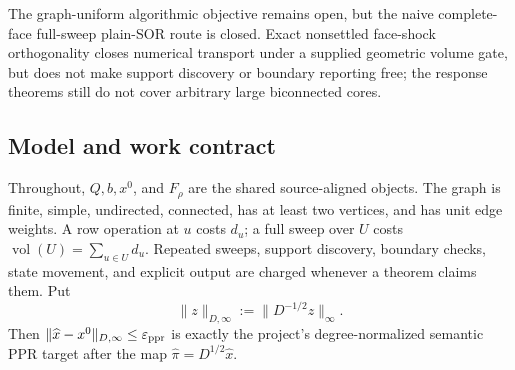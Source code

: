 The graph-uniform algorithmic objective remains open, but the naive
complete-face full-sweep plain-SOR route is closed.  Exact nonsettled
face-shock orthogonality closes numerical transport under a supplied
geometric volume gate, but does not make support discovery or boundary
reporting free; the response theorems still do not cover arbitrary large
biconnected cores.

\subsection{Model and work contract}

Throughout, $Q,b,x^0$, and $F_\rho$ are the shared source-aligned objects.
The graph is finite, simple, undirected, connected, has at least two vertices,
and has unit edge weights.  A row operation at $u$ costs $d_u$; a full sweep
over $U$ costs
$\operatorname{vol}(U)=\sum_{u\in U}d_u$.  Repeated sweeps, support discovery,
boundary checks, state movement, and explicit output are charged whenever a
theorem claims them.  Put
\begin{equation}
 \|z\|_{D,\infty}:=\|D^{-1/2}z\|_\infty.
 \label{eq:semantic-x-norm}
\end{equation}
Then $\|\widehat x-x^0\|_{D,\infty}\leq\varepsilon_{\rm ppr}$ is exactly the
project's degree-normalized semantic PPR target after the map
$\widehat\pi=D^{1/2}\widehat x$.
